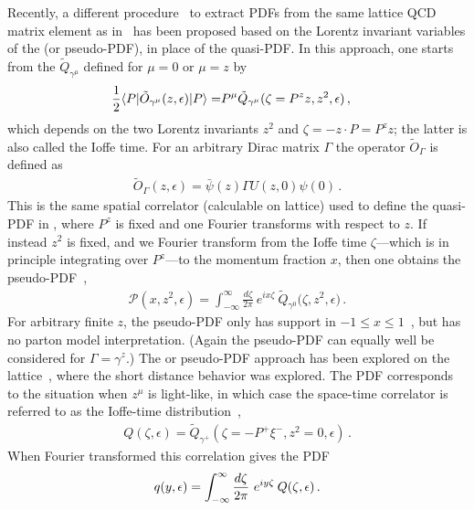 Recently, a different procedure~\cite{Radyushkin:2017cyf} to extract PDFs from the same lattice QCD matrix element as in~\cite{Ji:2013dva}
has been proposed based on the Lorentz invariant variables of the \spcorr (or pseudo-PDF), in place of the quasi-PDF. In this approach, one starts from the \spcorr $\tilde{Q}_{\gamma^\mu}$ defined for $\mu=0$ or $\mu=z$ by
\begin{align}
	{1\over2}\langle P | \tilde{O}_{\gamma^\mu}(z,\epsilon) | P\rangle
	= & P^\mu \tilde{Q}_{\gamma^\mu}(\zeta=P^zz,z^2,\epsilon) \,,
\end{align}
which depends on the two Lorentz invariants $z^2$ and $\zeta=-z\cdot P = P^z z$; the latter is also called the Ioffe time.
For an arbitrary Dirac matrix $\Gamma$ the operator $\tilde{O}_\Gamma$ is defined as
\begin{align} \label{eq:OGamma}
	\tilde{O}_{\Gamma}(z,\epsilon)  = \bar{\psi}  (z) \Gamma U (z, 0) \psi (0) \,.
\end{align}
This is the same spatial correlator (calculable on lattice) used to define the quasi-PDF in , where $P^z$ is fixed and one Fourier transforms with respect to $z$. If instead $z^2$ is fixed, and we Fourier transform from the Ioffe time $\zeta$---which is in principle integrating over $P^z$---to the momentum fraction $x$, then one obtains the pseudo-PDF~\cite{Radyushkin:2017cyf},
\begin{align} \label{eq:pseudo}
\mathcal{P} \left( x, z^2,\epsilon\right)
   = \int_{-\infty}^\infty \! \frac{d \zeta}{2\pi}\:
    e^{ix \zeta}\: \tilde{Q}_{\gamma^0}\bigl( \zeta, z^2,\epsilon \bigr)
   \,.
\end{align}
For arbitrary finite $z$, the pseudo-PDF only has support in $-1\le x \le 1$~\cite{Radyushkin:1983wh,Radyushkin:2016hsy}, but has no parton model interpretation.
(Again the pseudo-PDF can equally well be considered for $\Gamma=\gamma^z$.) The \spcorr or pseudo-PDF approach has been explored on the lattice~\cite{Orginos:2017kos,Karpie:2017bzm}, where the short distance behavior was explored.
The PDF corresponds to the situation when $z^\mu$ is light-like, in which case the space-time correlator is referred to as the Ioffe-time distribution~\cite{Ioffe:1969kf},
\begin{align}
 Q(\zeta,\epsilon) = \tilde Q_{\gamma^+}(\zeta=-P^+\xi^-,z^2=0,\epsilon)
  \,.
\end{align}
When Fourier transformed this correlation gives the PDF
\begin{align} \label{eq:Qdefn}
q(y,\epsilon) =\int_{-\infty}^{\infty} {d\zeta\over 2\pi} \ e^{iy\zeta}\: Q(\zeta,\epsilon)\,.
\end{align}
